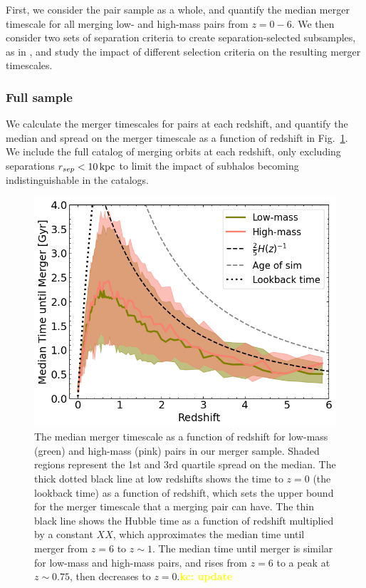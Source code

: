 \documentclass[twocolumn,linenumbers]{aastex631}
\newcommand{\kc}[1]{\textcolor{yellow}{\textbf{kc: #1}} }
\newcommand{\chambe}{\citet{Chamberlain2024}}
\begin{document}
    First, we consider the pair sample as a whole, and quantify the median merger timescale for all merging low- and high-mass pairs from $z=0-6$. 
    We then consider two sets of separation criteria to create separation-selected subsamples, as in \chambe{}, and study the impact of different selection criteria on the resulting merger timescales. 
    

    \subsubsection{Full sample}
        We calculate the merger timescales for pairs at each redshift, and quantify the median and spread on the merger timescale as a function of redshift in Fig.~\ref{fig:timescales}. 
        We include the full catalog of merging orbits at each redshift, only excluding separations $r_{sep}<10\mathrm{\,kpc}$ to limit the impact of subhalos becoming indistinguishable in the \subfind{} catalogs.%

        
        \begin{figure}[tb]
            \centering
            \includegraphics[width=\columnwidth]{plots/bet-on-it/8_timescale_mod.png}
            \caption{The median merger timescale as a function of redshift for low-mass (green) and high-mass (pink) pairs in our merger sample. 
            Shaded regions represent the 1st and 3rd quartile spread on the median. 
            The thick dotted black line at low redshifts shows the time to $z=0$ (the lookback time) as a function of redshift, which sets the upper bound for the merger timescale that a merging pair can have. 
            The thin black line shows the Hubble time as a function of redshift multiplied by a constant $XX$, which approximates the median time until merger from $z=6$ to $z\sim1$.
            The median time until merger is similar for low-mass and high-mass pairs, and rises from $z=6$ to a peak at $z\sim0.75$, then decreases to $z=0$.\kc{update}}
            \label{fig:timescales}
        \end{figure}
    
\end{document}
